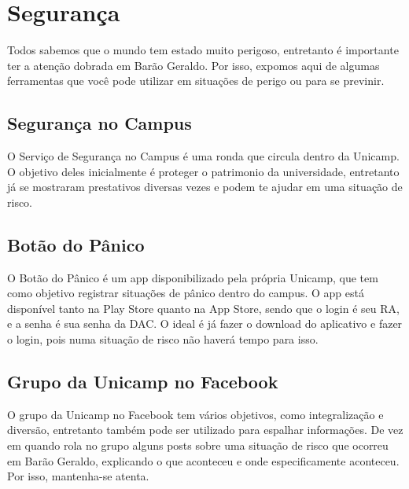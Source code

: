 
\section{Segurança}

Todos sabemos que o mundo tem estado muito perigoso, entretanto é importante ter a atenção dobrada em Barão Geraldo. Por isso, expomos aqui de algumas ferramentas que você pode utilizar em situações de perigo ou para se previnir.

\subsection{Segurança no Campus}

O Serviço de Segurança no Campus é uma ronda que circula dentro da Unicamp. O objetivo deles inicialmente é proteger o patrimonio da universidade, entretanto já se mostraram prestativos diversas vezes e podem te ajudar em uma situação de risco.

\subsection{Botão do Pânico}

O Botão do Pânico é um app disponibilizado pela própria Unicamp, que tem como objetivo registrar situações de pânico dentro do campus. O app está disponível tanto na Play Store quanto na App Store, sendo que o login é seu RA, e a senha é sua senha da DAC. O ideal é já fazer o download do aplicativo e fazer o login, pois numa situação de risco não haverá tempo para isso.

\subsection{Grupo da Unicamp no Facebook}

O grupo da Unicamp no Facebook tem vários objetivos, como integralização e diversão, entretanto também pode ser utilizado para espalhar informações. De vez em quando rola no grupo alguns posts sobre uma situação de risco que ocorreu em Barão Geraldo, explicando o que aconteceu e onde especificamente aconteceu. Por isso, mantenha-se atenta.
